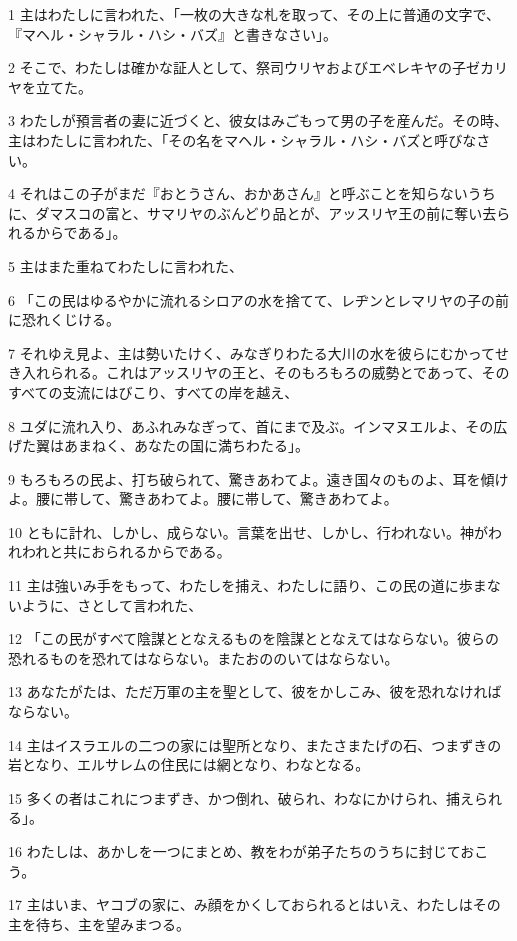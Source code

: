 \par 1 主はわたしに言われた、「一枚の大きな札を取って、その上に普通の文字で、『マヘル・シャラル・ハシ・バズ』と書きなさい」。
\par 2 そこで、わたしは確かな証人として、祭司ウリヤおよびエベレキヤの子ゼカリヤを立てた。
\par 3 わたしが預言者の妻に近づくと、彼女はみごもって男の子を産んだ。その時、主はわたしに言われた、「その名をマヘル・シャラル・ハシ・バズと呼びなさい。
\par 4 それはこの子がまだ『おとうさん、おかあさん』と呼ぶことを知らないうちに、ダマスコの富と、サマリヤのぶんどり品とが、アッスリヤ王の前に奪い去られるからである」。
\par 5 主はまた重ねてわたしに言われた、
\par 6 「この民はゆるやかに流れるシロアの水を捨てて、レヂンとレマリヤの子の前に恐れくじける。
\par 7 それゆえ見よ、主は勢いたけく、みなぎりわたる大川の水を彼らにむかってせき入れられる。これはアッスリヤの王と、そのもろもろの威勢とであって、そのすべての支流にはびこり、すべての岸を越え、
\par 8 ユダに流れ入り、あふれみなぎって、首にまで及ぶ。インマヌエルよ、その広げた翼はあまねく、あなたの国に満ちわたる」。
\par 9 もろもろの民よ、打ち破られて、驚きあわてよ。遠き国々のものよ、耳を傾けよ。腰に帯して、驚きあわてよ。腰に帯して、驚きあわてよ。
\par 10 ともに計れ、しかし、成らない。言葉を出せ、しかし、行われない。神がわれわれと共におられるからである。
\par 11 主は強いみ手をもって、わたしを捕え、わたしに語り、この民の道に歩まないように、さとして言われた、
\par 12 「この民がすべて陰謀ととなえるものを陰謀ととなえてはならない。彼らの恐れるものを恐れてはならない。またおののいてはならない。
\par 13 あなたがたは、ただ万軍の主を聖として、彼をかしこみ、彼を恐れなければならない。
\par 14 主はイスラエルの二つの家には聖所となり、またさまたげの石、つまずきの岩となり、エルサレムの住民には網となり、わなとなる。
\par 15 多くの者はこれにつまずき、かつ倒れ、破られ、わなにかけられ、捕えられる」。
\par 16 わたしは、あかしを一つにまとめ、教をわが弟子たちのうちに封じておこう。
\par 17 主はいま、ヤコブの家に、み顔をかくしておられるとはいえ、わたしはその主を待ち、主を望みまつる。
